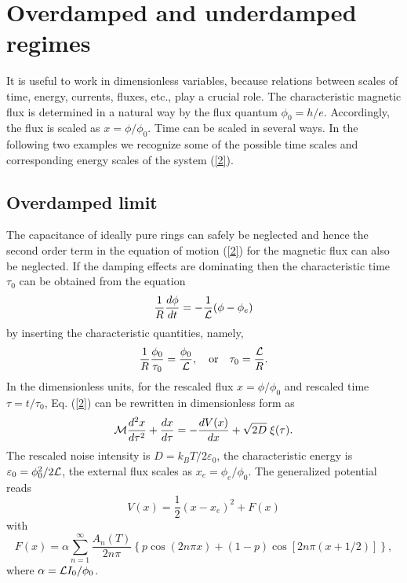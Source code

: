 \documentclass[a4paper,final]{appolb}
\begin{document}

\section{Overdamped and underdamped regimes} 

It is useful to work in dimensionless variables, because  relations 
between scales of time, energy, currents, fluxes,  etc., play a crucial role. 
The characteristic magnetic flux is determined in a natural way by the 
flux quantum $\phi _0 = h/e$. Accordingly, the flux is scaled as 
$x=\phi/\phi_0$. Time can be scaled in several ways.   
In the following two examples we recognize some of the possible 
time scales and 
corresponding energy scales of the system (\ref{2}).


\subsection{Overdamped limit}

The capacitance of  ideally pure rings can safely be neglected and hence 
the second order term in the equation of motion (\ref{2}) for the magnetic flux can also be neglected.  
If the damping effects are dominating then  
the characteristic time $\tau_0$ can be obtained from the equation 
%
\begin{equation}\label{dam1}
\frac{1}{R}\frac{d\phi}{dt} = -\frac{1}{{\cal L}}(\phi-\phi_{e}) 
\end{equation}
%
by inserting the characteristic quantities, namely, 
%
\begin{equation}\label{dam11}
\frac{1}{R}\frac{\phi_0}{\tau_0} = \frac{\phi_0}{{\cal L}}, 
\quad \mbox{or} \quad  \tau_0=\frac{{\cal L}}{R}.
\end{equation}
%
In the dimensionless units, for the rescaled flux $x=\phi/\phi_0$ and rescaled   time $\tau =t/\tau_0$,  
Eq. (\ref{2}) can be rewritten in dimensionless form  as
%
\begin{equation}\label{BE}
{\cal{M}} \frac{d^2 x}{d\tau^2}+\frac{dx}{d\tau}
=-\frac{dV(x)}{dx}+\sqrt{2D}\;\xi(\tau).
\end{equation}
%
The rescaled noise intensity is $D=k_BT/2\varepsilon _0$, the characteristic energy is
$\varepsilon _0= \phi_{0}^{2}/2{\cal L}$, the external flux scales as
 $x_e=\phi_{e}/\phi_0$. The generalized potential reads
%
\begin{equation}\label{V}
V(x)=\frac{1}{2}(x-x_e )^2 + F(x)
\end{equation}
%
with
%
\begin{equation}\label{F}
 F(x)= \alpha \sum_{n=1}^{\infty}\frac{A_n(T)}{2n\pi} \left\{ 
p\cos(2n\pi x)+(1-p)\cos\left[2n\pi(x+1/2)\right]\right\},
\end{equation}
%
where $\alpha={\cal L}I_0/\phi_0$. 
\end{document}

